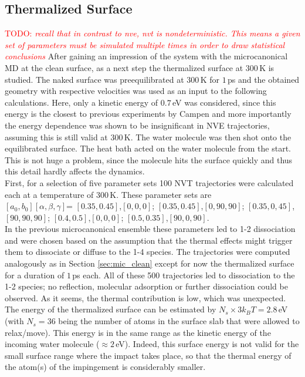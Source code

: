\documentclass[11pt,DIV=13,BCOR=5mm,a4paper,headinclude]{scrbook}
\newcommand\todo[1]{\textcolor{red}{TODO: \textit{{#1}}}}
\begin{document}
\subsection{Thermalized Surface}\label{therm_surf}
\todo{recall that in contrast to nve, nvt is nondeterministic. This means a given set of parameters must be simulated multiple times in order to draw statistical conclusions} 
After gaining an impression of the system with the microcanonical MD at the clean surface, as a next step the thermalized surface at $300\,$K is studied.
The naked surface was preequilibrated at $300\,$K for $1\,$ps and the obtained geometry with respective velocities was used as an input to the following calculations.
Here, only a kinetic energy of $0.7\,$eV was considered, since this energy is the closest to previous experiments by Campen and more importantly the energy dependence was shown to be insignificant in NVE trajectories, assuming this is still valid at $300\,$K.
The water molecule was then shot onto the equilibrated surface.
The heat bath acted on the water molecule from the start.
This is not huge a problem, since the molecule hits the surface quickly and thus this detail hardly affects the dynamics.
\\
First, for a selection of five parameter sets 100 NVT trajectories were calculated each at a temperature of $300\,$K.
These parameter sets are\\ $[a_0,b_0][\alpha,\beta,\gamma]$= $[0.35,0.45]$,$[0,0,0]$; $[0.35,0.45]$,$[0,90,90]$; $[0.35,0,45]$,$[90,90,90]$; $[0.4,0.5]$,$[0,0,0]$;  $[0.5,0.35]$,$[90,0,90]$.\\
In the previous microcanonical ensemble these parameters led to 1-2 dissociation and were chosen based on the assumption that the thermal effects might trigger them to dissociate or diffuse to the 1-4 species.
The trajectories were computed analogously as in Section \ref{sec:mic_clean} except for now the thermalized surface for a duration of $1\,$ps each.
All of these 500 trajectories led to dissociation to the 1-2 species; no reflection, molecular adsorption or further dissociation could be observed.
As it seems, the thermal contribution is low, which was unexpected.
The energy of the thermalized surface can be estimated by $N_s\times 3k_BT=2.8\,$eV (with $N_s=36$ being the number of atoms in the surface slab that were allowed to relax/move).
This energy is in the same range as the kinetic energy of the incoming water molecule ($\approx2\,$eV).
Indeed, this surface energy is not valid for the small surface range where the impact takes place, so that the thermal energy of the atom(s) of the impingement is considerably smaller.
\end{document}
